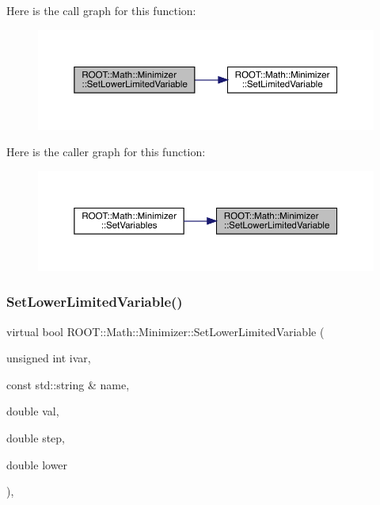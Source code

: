Here is the call graph for this function\+:
\nopagebreak
\begin{figure}[H]
\begin{center}
\leavevmode
\includegraphics[width=350pt]{dc/dc4/classROOT_1_1Math_1_1Minimizer_a0fed20bdc58d05ce2b92d2bf47594dfb_cgraph}
\end{center}
\end{figure}
Here is the caller graph for this function\+:
\nopagebreak
\begin{figure}[H]
\begin{center}
\leavevmode
\includegraphics[width=350pt]{dc/dc4/classROOT_1_1Math_1_1Minimizer_a0fed20bdc58d05ce2b92d2bf47594dfb_icgraph}
\end{center}
\end{figure}
\mbox{\label{classROOT_1_1Math_1_1Minimizer_a0fed20bdc58d05ce2b92d2bf47594dfb}} 
\subsubsection{\texorpdfstring{SetLowerLimitedVariable()}{SetLowerLimitedVariable()}\hspace{0.1cm}{\footnotesize\ttfamily [3/3]}}
{\footnotesize\ttfamily virtual bool R\+O\+O\+T\+::\+Math\+::\+Minimizer\+::\+Set\+Lower\+Limited\+Variable (\begin{DoxyParamCaption}\item[{unsigned int}]{ivar,  }\item[{const std\+::string \&}]{name,  }\item[{double}]{val,  }\item[{double}]{step,  }\item[{double}]{lower }\end{DoxyParamCaption})\hspace{0.3cm}{\ttfamily [inline]}, {\ttfamily [virtual]}}



